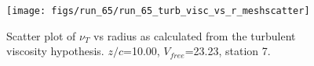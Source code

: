 \begin{figure}[H]
\centering
\texttt{[image: figs/run\_65/run\_65\_turb\_visc\_vs\_r\_meshscatter]}
\caption{Scatter plot of $\nu_T$ vs radius as calculated from the turbulent viscosity hypothesis. $z/c$=10.00, $V_{free}$=23.23, station 7.}
\label{fig:run_65_turb_visc_vs_r_meshscatter}
\end{figure}


